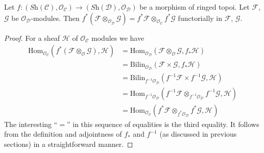 \begin{lemma}
\label{lemma-tensor-product-pullback}
Let $f : (\textit{Sh}(\mathcal{C}), \mathcal{O}_{\mathcal{C}})
\to (\textit{Sh}(\mathcal{D}), \mathcal{O}_{\mathcal{D}})$ be
a morphism of ringed topoi. Let $\mathcal{F}$, $\mathcal{G}$
be $\mathcal{O}_{\mathcal{D}}$-modules. Then
$f^*(\mathcal{F} \otimes_{\mathcal{O}_{\mathcal{D}}} \mathcal{G})
= f^*\mathcal{F} \otimes_{\mathcal{O}_{\mathcal{C}}} f^*\mathcal{G}$
functorially in $\mathcal{F}$, $\mathcal{G}$.
\end{lemma}

\begin{proof}
For a sheaf $\mathcal{H}$ of $\mathcal{O}_{\mathcal{C}}$ modules we
have
\begin{align*}
\text{Hom}_{\mathcal{O}_{\mathcal{C}}}(
f^*(\mathcal{F} \otimes_{\mathcal{O}} \mathcal{G}), \mathcal{H})
& =
\text{Hom}_{\mathcal{O}_{\mathcal{D}}}(
\mathcal{F} \otimes_{\mathcal{O}} \mathcal{G}, f_*\mathcal{H}) \\
& =
\text{Bilin}_{\mathcal{O}_{\mathcal{D}}}(
\mathcal{F} \times \mathcal{G}, f_*\mathcal{H}) \\
& =
\text{Bilin}_{f^{-1}\mathcal{O}_{\mathcal{D}}}(
f^{-1}\mathcal{F} \times f^{-1}\mathcal{G}, \mathcal{H}) \\
& =
\text{Hom}_{f^{-1}\mathcal{O}_{\mathcal{D}}}(
f^{-1}\mathcal{F} \otimes_{f^{-1}\mathcal{O}_{\mathcal{D}}} f^{-1}\mathcal{G},
\mathcal{H}) \\
& =
\text{Hom}_{\mathcal{O}_{\mathcal{C}}}(
f^*\mathcal{F} \otimes_{f^*\mathcal{O}_{\mathcal{D}}} f^*\mathcal{G},
\mathcal{H})
\end{align*}
The interesting ``$=$'' in this sequence of equalities is the 
third equality. It follows from the definition and adjointness of
$f_*$ and $f^{-1}$ (as discussed in previous sections) in a
straightforward manner.
\end{proof}



